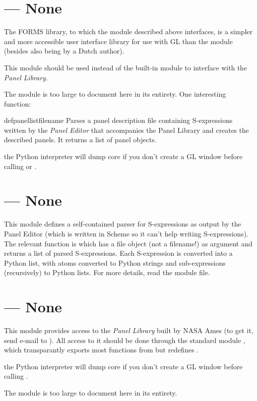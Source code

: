 \section{ ---
         None}



 The FORMS library, to which the
 module described above interfaces, is a
simpler and more accessible user interface library for use with GL
than the  module (besides also being by a Dutch author).

This module should be used instead of the built-in module
to interface with the
\emph{Panel Library}.

The module is too large to document here in its entirety.
One interesting function:

\begin{funcdesc}{defpanellist}{filename}
Parses a panel description file containing S-expressions written by the
\emph{Panel Editor}
that accompanies the Panel Library and creates the described panels.
It returns a list of panel objects.
\end{funcdesc}

the Python interpreter will dump core if you don't create a GL window
before calling
or
.

\section{ ---
         None}



This module defines a self-contained parser for S-expressions as output
by the Panel Editor (which is written in Scheme so it can't help writing
S-expressions).
The relevant function is
which has a file object (not a filename!) as argument and returns a list
of parsed S-expressions.
Each S-expression is converted into a Python list, with atoms converted
to Python strings and sub-expressions (recursively) to Python lists.
For more details, read the module file.

\section{ ---
         None}



This module provides access to the
\emph{Panel Library}
built by NASA Ames (to get it, send e-mail to
).
All access to it should be done through the standard module
,
which transparantly exports most functions from
but redefines
.

the Python interpreter will dump core if you don't create a GL window
before calling
.

The module is too large to document here in its entirety.
